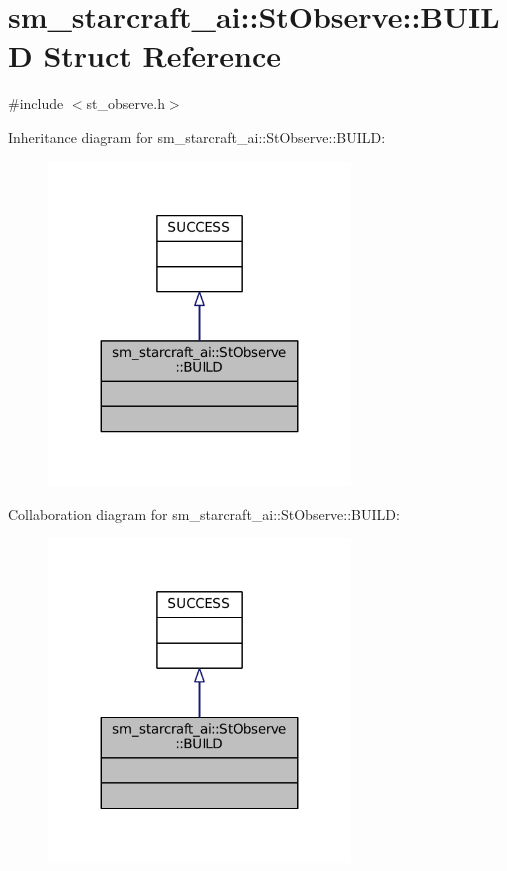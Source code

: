 \hypertarget{structsm__starcraft__ai_1_1StObserve_1_1BUILD}{}\section{sm\+\_\+starcraft\+\_\+ai\+:\+:St\+Observe\+:\+:B\+U\+I\+LD Struct Reference}
\label{structsm__starcraft__ai_1_1StObserve_1_1BUILD}


{\ttfamily \#include $<$st\+\_\+observe.\+h$>$}



Inheritance diagram for sm\+\_\+starcraft\+\_\+ai\+:\+:St\+Observe\+:\+:B\+U\+I\+LD\+:
\nopagebreak
\begin{figure}[H]
\begin{center}
\leavevmode
\includegraphics[width=227pt]{structsm__starcraft__ai_1_1StObserve_1_1BUILD__inherit__graph}
\end{center}
\end{figure}


Collaboration diagram for sm\+\_\+starcraft\+\_\+ai\+:\+:St\+Observe\+:\+:B\+U\+I\+LD\+:
\nopagebreak
\begin{figure}[H]
\begin{center}
\leavevmode
\includegraphics[width=227pt]{structsm__starcraft__ai_1_1StObserve_1_1BUILD__coll__graph}
\end{center}
\end{figure}


